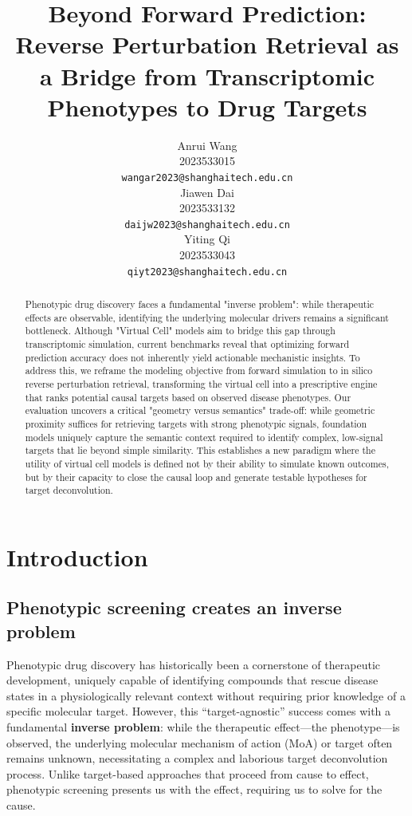 \documentclass{article}
\title{Beyond Forward Prediction: Reverse Perturbation Retrieval as a Bridge from Transcriptomic Phenotypes to Drug Targets}
\author{
	Anrui Wang \\
	2023533015 \\
	\texttt{wangar2023@shanghaitech.edu.cn}\\
	\And
	Jiawen Dai \\
	2023533132 \\
	\texttt{daijw2023@shanghaitech.edu.cn}\\
	\AND
	Yiting Qi \\
	2023533043 \\
	\texttt{qiyt2023@shanghaitech.edu.cn}\\
}
\begin{document}
\maketitle

\begin{abstract}
Phenotypic drug discovery faces a fundamental "inverse problem": while therapeutic effects are observable, identifying the underlying molecular drivers remains a significant bottleneck. Although "Virtual Cell" models aim to bridge this gap through transcriptomic simulation, current benchmarks reveal that optimizing forward prediction accuracy does not inherently yield actionable mechanistic insights. To address this, we reframe the modeling objective from forward simulation to in silico reverse perturbation retrieval, transforming the virtual cell into a prescriptive engine that ranks potential causal targets based on observed disease phenotypes. Our evaluation uncovers a critical "geometry versus semantics" trade-off: while geometric proximity suffices for retrieving targets with strong phenotypic signals, foundation models uniquely capture the semantic context required to identify complex, low-signal targets that lie beyond simple similarity. This establishes a new paradigm where the utility of virtual cell models is defined not by their ability to simulate known outcomes, but by their capacity to close the causal loop and generate testable hypotheses for target deconvolution.
\end{abstract}
	
	
\section{Introduction}

\subsection{Phenotypic screening creates an inverse problem}

Phenotypic drug discovery has historically been a cornerstone of therapeutic development, uniquely capable of identifying compounds that rescue disease states in a physiologically relevant context without requiring prior knowledge of a specific molecular target. However, this ``target-agnostic'' success comes with a fundamental \textbf{inverse problem}: while the therapeutic effect—the phenotype—is observed, the underlying molecular mechanism of action (MoA) or target often remains unknown, necessitating a complex and laborious target deconvolution process. Unlike target-based approaches that proceed from cause to effect, phenotypic screening presents us with the effect, requiring us to solve for the cause.
\end{document}
